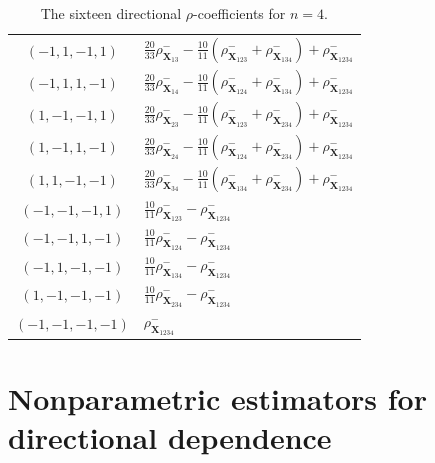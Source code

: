 \documentclass[11pt,a4paper]{article}
\begin{document}
\begin{table}[htb]
\begin{center}
\begin{longtable}{c p{}}
$(-1,1,-1,1)$ & $\frac{20}{33}\rho^-_{\mathbf{X}_{13}} - \frac{10}{11}(\rho^-_{\mathbf{X}_{123}} + \rho^-_{\mathbf{X}_{134}}) + \rho^-_{\mathbf{X}_{1234}}$ \\

$(-1,1,1,-1)$ & $\frac{20}{33}\rho^-_{\mathbf{X}_{14}} - \frac{10}{11}(\rho^-_{\mathbf{X}_{124}} + \rho^-_{\mathbf{X}_{134}}) + \rho^-_{\mathbf{X}_{1234}}$ \\

$(1,-1,-1,1)$ & $\frac{20}{33}\rho^-_{\mathbf{X}_{23}} - \frac{10}{11}(\rho^-_{\mathbf{X}_{123}} + \rho^-_{\mathbf{X}_{234}}) + \rho^-_{\mathbf{X}_{1234}}$ \\

$(1,-1,1,-1)$ & $\frac{20}{33}\rho^-_{\mathbf{X}_{24}} - \frac{10}{11}(\rho^-_{\mathbf{X}_{124}} + \rho^-_{\mathbf{X}_{234}}) + \rho^-_{\mathbf{X}_{1234}}$ \\

$(1,1,-1,-1)$ & $\frac{20}{33}\rho^-_{\mathbf{X}_{34}} - \frac{10}{11}(\rho^-_{\mathbf{X}_{134}} + \rho^-_{\mathbf{X}_{234}}) + \rho^-_{\mathbf{X}_{1234}}$ \\

$(-1,-1,-1,1)$ & $\frac{10}{11}\rho^-_{\mathbf{X}_{123}} - \rho^-_{\mathbf{X}_{1234}}$ \\

$(-1,-1,1,-1)$ & $\frac{10}{11}\rho^-_{\mathbf{X}_{124}} - \rho^-_{\mathbf{X}_{1234}}$ \\

$(-1,1,-1,-1)$ & $\frac{10}{11}\rho^-_{\mathbf{X}_{134}} - \rho^-_{\mathbf{X}_{1234}}$ \\

$(1,-1,-1,-1)$ & $\frac{10}{11}\rho^-_{\mathbf{X}_{234}} - \rho^-_{\mathbf{X}_{1234}}$ \\

$(-1,-1,-1,-1)$ & $\rho^-_{\mathbf{X}_{1234}}$ \\
\hline
\end{longtable}
\caption{The sixteen directional $\rho$-coefficients for $n=4$.} \label{tab:n4_coefficients}
\end{center}
\end{table}



\section{Nonparametric estimators for directional dependence}\label{sec:esti}
\end{document}
